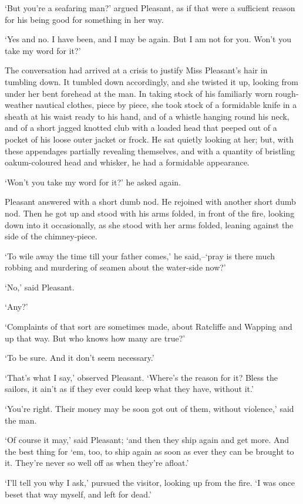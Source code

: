 ‘But you’re a seafaring man?’ argued Pleasant, as if that were a
sufficient reason for his being good for something in her way.

‘Yes and no. I have been, and I may be again. But I am not for you.
Won’t you take my word for it?’

The conversation had arrived at a crisis to justify Miss Pleasant’s hair
in tumbling down. It tumbled down accordingly, and she twisted it up,
looking from under her bent forehead at the man. In taking stock of his
familiarly worn rough-weather nautical clothes, piece by piece, she took
stock of a formidable knife in a sheath at his waist ready to his hand,
and of a whistle hanging round his neck, and of a short jagged knotted
club with a loaded head that peeped out of a pocket of his loose
outer jacket or frock. He sat quietly looking at her; but, with these
appendages partially revealing themselves, and with a quantity
of bristling oakum-coloured head and whisker, he had a formidable
appearance.

‘Won’t you take my word for it?’ he asked again.

Pleasant answered with a short dumb nod. He rejoined with another short
dumb nod. Then he got up and stood with his arms folded, in front of
the fire, looking down into it occasionally, as she stood with her arms
folded, leaning against the side of the chimney-piece.

‘To wile away the time till your father comes,’ he said,--‘pray is there
much robbing and murdering of seamen about the water-side now?’

‘No,’ said Pleasant.

‘Any?’

‘Complaints of that sort are sometimes made, about Ratcliffe and Wapping
and up that way. But who knows how many are true?’

‘To be sure. And it don’t seem necessary.’

‘That’s what I say,’ observed Pleasant. ‘Where’s the reason for it?
Bless the sailors, it ain’t as if they ever could keep what they have,
without it.’

‘You’re right. Their money may be soon got out of them, without
violence,’ said the man.

‘Of course it may,’ said Pleasant; ‘and then they ship again and get
more. And the best thing for ‘em, too, to ship again as soon as ever
they can be brought to it. They’re never so well off as when they’re
afloat.’

‘I’ll tell you why I ask,’ pursued the visitor, looking up from the
fire. ‘I was once beset that way myself, and left for dead.’

